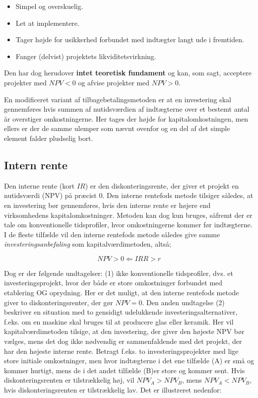 \documentclass[10pt,reqno, usenames]{article}
\begin{document}
\begin{itemize}
    \item Simpel og overskuelig.
    \item Let at implementere.
    \item Tager højde for usikkerhed forbundet med indtægter langt ude i fremtiden. 
    \item Fanger (delvist) projektets likviditetsvirkning. 
\end{itemize}

Den har dog herudover \textbf{intet teoretisk fundament} og kan, som sagt, acceptere projekter med $NPV<0$ og afvise projekter med $NPV>0$. 

\vspace{10 pt}

En modificeret variant af tilbagebetalingsmetoden er at en investering skal
gennemføres hvis summen af nutidsværdien af indtægterne over
et bestemt antal år overstiger omkostningerne. Her tages der højde for kapitalomkostningen, men ellers er der de samme ulemper som nævnt ovenfor og en del af det simple element falder pludselig bort. 

\subsection{Intern rente}
Den interne rente (kort $IR$) er den diskonteringsrente, der giver et projekt en nutidsværdi (NPV) på præcist 0. Den interne rentefods metode tilsiger således, at en investering bør gennemføres, hvis den interne rente er højere end virksomhedens kapitalomkostninger. Metoden kan dog kun bruges, såfremt der er tale om konventionelle tidsprofiler, hvor omkostningerne kommer før indtægterne. I de fleste tilfælde vil den interne rentefods metode således give samme \textit{investeringsanbefaling} som kapitalværdimetoden, altså; 

\begin{equation}
    NPV > 0 \Longleftarrow IRR > r
\end{equation}

Dog er der følgende undtagelser: (1) ikke konventionelle tidsprofiler, dvs. et investeringsprojekt, hvor der både er store omkostninger forbundet med etablering OG oprydning. Her er det muligt, at den interne rentefods metode giver to diskonteringsrenter, der gør $NPV=0$. Den anden undtagelse (2) beskriver en situation med to gensidigt udelukkende investeringsalternativer, f.eks. om en maskine skal bruges til at producere glas eller keramik. Her vil kapitalværdimetoden tilsige, at den investering, der giver den højeste NPV bør vælges, mens det dog ikke nødvendig er sammenfaldende med det projekt, der har den højeste interne rente. Betragt f.eks. to investeringsprojekter med lige store initiale omkostninger, men hvor indtægterne i det ene tilfælde (A) er små og kommer hurtigt, mens de i det andet tilfælde (B)er store og kommer sent. Hvis diskonteringsrenten er tilstrækkelig høj, vil $NPV_A > NPV_B$, mens $NPV_A<NPV_B$, hvis diskonteringsrenten er tilstrækkelig lav. Det er illustreret nedenfor: 
\end{document}
